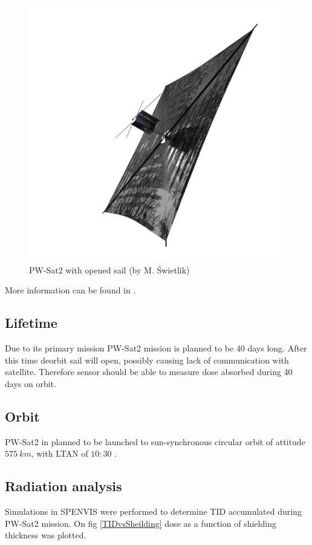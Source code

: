 	\begin{figure}[H]
		\centering
		\includegraphics[width=0.7\paperwidth]{img/PW-Sat2_render_02.png}
		\caption{PW-Sat2 with opened sail (by M. Świetlik)}
		\label{PW-Sat_render_sail}
	\end{figure}
	
	More information can be found in \cite{DDC_article}.
	
\subsection{Lifetime}
	Due to its primary mission PW-Sat2 mission is planned to be 40 days long. After this time deorbit sail will open, possibly causing lack of communication with satellite. Therefore sensor should be able to measure dose absorbed during 40 days on orbit.
	
\subsection{Orbit}
	PW-Sat2 in planned to be launched to sun-synchronous circular orbit of attitude $575~km$, with LTAN of $10:30$ \cite{PWSAT_MA_CDR}.
	

\subsection{Radiation analysis}
	Simulations in SPENVIS \cite{SPENVIS_URL} were performed to determine TID accumulated during PW-Sat2 mission. On fig \ref{TIDvsSheilding} dose as a function of shielding thickness was plotted.

